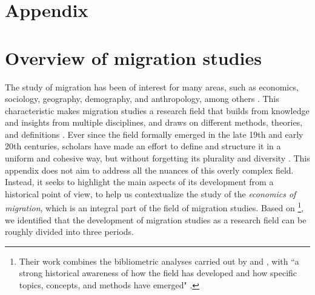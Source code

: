 \appendix
\section*{Appendix}

\section{Overview of migration studies} \label{migration_studies}

The study of migration has been of interest for many areas, such as economics, sociology, geography, demography, and anthropology, among others \citep{cohen_introduction_1996, brettell_introduction_2015}. This characteristic makes migration studies a research field that builds from knowledge and insights from multiple disciplines, and draws on different methods, theories, and definitions \citep{scholten_introduction_2022, brettell_introduction_2015, king_theories_2012}. Ever since the field formally emerged in the late 19th and early 20th centuries, scholars have made an effort to define and structure it in a uniform and cohesive way, but without forgetting its plurality and diversity \citep{scholten_introduction_2022}. This appendix does not aim to address all the nuances of this overly complex field. Instead, it seeks to highlight the main aspects of its development from a historical point of view, to help us contextualize the study of the \textit{economics of migration}, which is an integral part of the field of migration studies. Based on \cite[p. 9-21]{scholten_introduction_2022}\footnote{Their work combines the bibliometric analyses carried out by \cite{levy_between_2020} and \cite{pisarevskaya_mapping_2020}, with ``a strong historical awareness of how the field has developed and how specific topics, concepts, and methods have emerged" \citep[p. 5]{scholten_introduction_2022}.}, we identified that the development of migration studies as a research field can be roughly divided into three periods.

